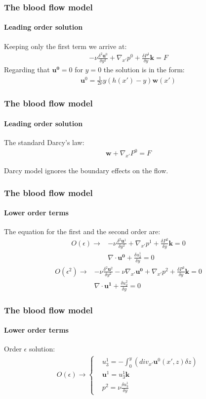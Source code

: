 \documentclass{beamer}
\begin{document}
\begin{frame}
\frametitle{The blood flow model}
\framesubtitle{Leading order solution}
Keeping only the first term we arrive at:
\begin{align*}
-\nu\frac{\delta^2 \mathbf{u}^0}{\delta y^2}+\nabla_{x'}p^0+\frac{\delta P^1}{\delta y}\mathbf{k}=F
\end{align*}
Regarding that $\mathbf{u^0}=0$ for $y=0$ the solution is in the form:
\begin{align*}
\mathbf{u}^0=\frac{1}{2\nu}y(h(x')-y)\mathbf{w}(x')
\end{align*}
\end{frame}

\begin{frame}
\frametitle{The blood flow model}
\framesubtitle{Leading order solution}
The standard Darcy's law:
\begin{align*}
\mathbf{w}+\nabla_{x'}P^0=F
\end{align*}

Darcy model \alert{ignores the boundary effects} on the flow. 
\end{frame}

\begin{frame}
\frametitle{The blood flow model}
\framesubtitle{Lower order terms}
The equation for the first and the second order are:
\begin{align*}
O(\epsilon)\to & -\nu\frac{\delta^2 \mathbf{u}^1}{\delta y^2}+\nabla_{x'}p^1+\frac{\delta P^2}{\delta y}\mathbf{k}=0\\
& \nabla \cdot \mathbf{u^0}+\frac{\delta u_2^1}{\delta y}=0
\end{align*}
\begin{align*}
O(\epsilon^2) \to& -\nu\frac{\delta^2 \mathbf{u}^2}{\delta y^2}-\nu\nabla_{x'}\mathbf{u^0}+\nabla_{x'}p^2+\frac{\delta P^3}{\delta y}\mathbf{k}=0\\
&\nabla \cdot \mathbf{u^1}+\frac{\delta u_2^2}{\delta y}=0
\end{align*}
\end{frame}
\begin{frame}
\frametitle{The blood flow model}
\framesubtitle{Lower order terms}
Order $\epsilon$ solution:
\begin{align*}
O(\epsilon)\to \begin{cases}
&u_3^1 = -\int_0^y(div_{x'}\mathbf{u}^0(x',z)\delta z)\\
&\mathbf{u}^1  = u_3^1\mathbf{k}\\
&p^2 = \nu\frac{\delta u_3^1}{\delta y}
\end{cases}
\end{align*}
\end{frame}
\end{document}
